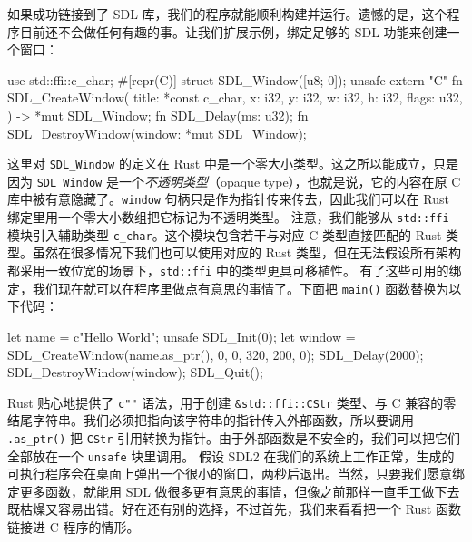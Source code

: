 如果成功链接到了 SDL 库，我们的程序就能顺利构建并运行。遗憾的是，这个程序目前还不会做任何有趣的事。让我们扩展示例，绑定足够的 SDL 功能来创建一个窗口：
\begin{codebox}[rust]
use std::ffi::c_char;
#[repr(C)]
struct SDL_Window([u8; 0]);
unsafe extern "C" {
    fn SDL_CreateWindow(
        title: *const c_char,
        x: i32, y: i32,
        w: i32, h: i32,
        flags: u32,
    ) -> *mut SDL_Window;
    fn SDL_Delay(ms: u32);
    fn SDL_DestroyWindow(window: *mut SDL_Window);
}
\end{codebox}
\label{idx:idx_d4523a69}
这里对 \texttt{SDL\_Window} 的定义在 Rust 中是一个零大小类型。这之所以能成立，只是因为
\texttt{SDL\_Window} 是一个\emph{不透明类型}（opaque type），也就是说，它的内容在原 C
库中被有意隐藏了。\texttt{window} 句柄只是作为指针传来传去，因此我们可以在 Rust 绑定里用一个零大小数组把它标记为不透明类型。
注意，我们能够从 \texttt{std::ffi} 模块引入辅助类型 \texttt{c\_char}。这个模块包含若干与对应 C 类型直接匹配的 Rust 类型。虽然在很多情况下我们也可以使用对应的 Rust 类型，但在无法假设所有架构都采用一致位宽的场景下，\texttt{std::ffi} 中的类型更具可移植性。
有了这些可用的绑定，我们现在就可以在程序里做点有意思的事情了。下面把 \texttt{main()} 函数替换为以下代码：
\begin{codebox}[rust]
let name = c"Hello World";
unsafe {
    SDL_Init(0);
    let window = SDL_CreateWindow(name.as_ptr(), 0, 0, 320, 200, 0);
    SDL_Delay(2000);
    SDL_DestroyWindow(window);
    SDL_Quit();
}
\end{codebox}
\label{idx:idx_08960b41}
Rust 贴心地提供了 \texttt{c""} 语法，用于创建 \texttt{\&\allowbreak{}std::\allowbreak{}ffi::\allowbreak{}CStr} 类型、与 C 兼容的零结尾字符串。我们必须把指向该字符串的指针传入外部函数，所以要调用 \texttt{.as\_ptr()} 把 \texttt{CStr} 引用转换为指针。由于外部函数是不安全的，我们可以把它们全部放在一个 \texttt{unsafe} 块里调用。
假设 SDL2 在我们的系统上工作正常，生成的可执行程序会在桌面上弹出一个很小的窗口，两秒后退出。当然，只要我们愿意绑定更多函数，就能用 SDL 做很多更有意思的事情，但像之前那样一直手工做下去既枯燥又容易出错。好在还有别的选择，不过首先，我们来看看把一个 Rust 函数链接进 C 程序的情形。
